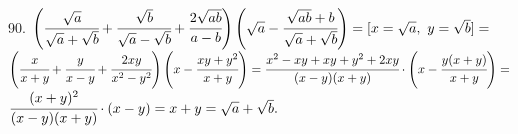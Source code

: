 90. $\left(\cfrac{\sqrt{a}}{\sqrt{a}+\sqrt{b}}+\cfrac{\sqrt{b}}{\sqrt{a}-\sqrt{b}}+\cfrac{2\sqrt{ab}}{a-b}\right)\left(\sqrt{a}-\cfrac{\sqrt{ab}+b}{\sqrt{a}+\sqrt{b}}\right)=
[x=\sqrt{a},\ y=\sqrt{b}]=$\\$
\left(\cfrac{x}{x+y}+\cfrac{y}{x-y}+\cfrac{2xy}{x^2-y^2}\right)\left(x-\cfrac{xy+y^2}{x+y}\right)=
\cfrac{x^2-xy+xy+y^2+2xy}{(x-y)(x+y)}\cdot\left(x-\cfrac{y(x+y)}{x+y}\right)=$\\$
\cfrac{(x+y)^2}{(x-y)(x+y)}\cdot\left(x-y\right)=x+y=\sqrt{a}+\sqrt{b}.$\\
